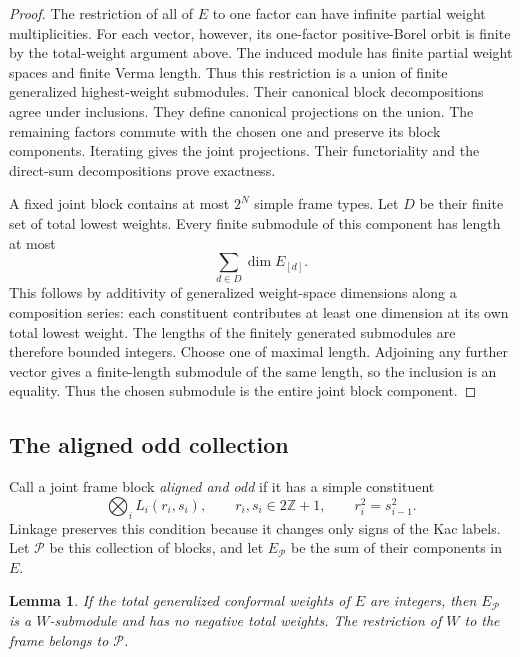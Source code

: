 \documentclass[11pt,a4paper]{article}
\numberwithin{equation}{section}
\newtheorem{lemma}[theorem]{Lemma}
\theoremstyle{definition}\newtheorem{definition}[theorem]{Definition}
\theoremstyle{remark}\newtheorem{remark}[theorem]{Remark}
\begin{document}
\begin{proof}
The restriction of all of $E$ to one factor can have infinite partial
weight multiplicities.  For each vector, however, its one-factor
positive-Borel orbit is finite by the total-weight argument above.
The induced module has finite partial weight spaces and finite Verma
length.  Thus this restriction is a union of finite generalized
highest-weight submodules.  Their canonical block decompositions
agree under inclusions.  They define canonical projections on the
union.  The remaining factors commute with the chosen one and
preserve its block components.  Iterating gives the joint projections.
Their functoriality and the direct-sum decompositions prove exactness.

A fixed joint block contains at most $2^N$ simple frame types.  Let
$D$ be their finite set of total lowest weights.  Every finite
submodule of this component has length at most
\[
                         \sum_{d\in D}\dim E_{[d]}.
\]
This follows by additivity of generalized weight-space dimensions
along a composition series: each constituent contributes at least one
dimension at its own total lowest weight.  The lengths of the finitely generated submodules are therefore
bounded integers.  Choose one of maximal length.  Adjoining any
further vector gives a finite-length submodule of the same length,
so the inclusion is an equality.  Thus the chosen submodule is the
entire joint block component.
\end{proof}

\subsection{The aligned odd collection}

Call a joint frame block \emph{aligned and odd} if it has a simple
constituent
\[
 \bigotimes_iL_i(r_i,s_i),\qquad
 r_i,s_i\in2\mathbb Z+1,\qquad r_i^2=s_{i-1}^2.
\]
Linkage preserves this condition because it changes only signs of
the Kac labels.  Let $\mathscr P$ be this collection of blocks, and
let $E_{\mathscr P}$ be the sum of their components in $E$.

\begin{lemma}\label{neutral:lem:aligned-odd-stable}
If the total generalized conformal weights of $E$ are integers,
then $E_{\mathscr P}$ is a $W$-submodule and has no negative total
weights.  The restriction of $W$ to the frame belongs to $\mathscr P$.
\end{lemma}
\end{document}
